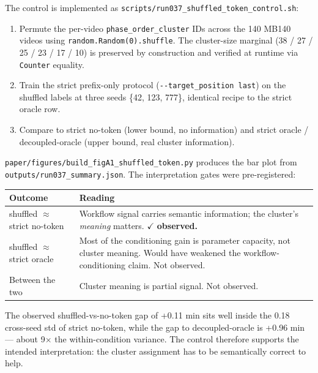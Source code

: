 The control is implemented as
\texttt{scripts/run037\_shuffled\_token\_control.sh}:

\begin{enumerate}
\def\labelenumi{\arabic{enumi}.}
\tightlist
\item
  Permute the per-video \texttt{phase\_order\_cluster} IDs across the
  140 MB140 videos using \texttt{random.Random(0).shuffle}. The
  cluster-size marginal (38 / 27 / 25 / 23 / 17 / 10) is preserved by
  construction and verified at runtime via \texttt{Counter} equality.
\item
  Train the strict prefix-only protocol
  (\texttt{-\/-target\_position\ last}) on the shuffled labels at three
  seeds \{42, 123, 777\}, identical recipe to the strict oracle row.
\item
  Compare to strict no-token (lower bound, no information) and strict
  oracle / decoupled-oracle (upper bound, real cluster information).
\end{enumerate}

\texttt{paper/figures/build\_figA1\_shuffled\_token.py} produces the bar
plot from \texttt{outputs/run037\_summary.json}. The interpretation
gates were pre-registered:

\begin{longtable}[]{@{}
  >{\raggedright\arraybackslash}p{}
  >{\raggedright\arraybackslash}p{}@{}}
\toprule\noalign{}
\begin{minipage}[b]{\linewidth}\raggedright
Outcome
\end{minipage} & \begin{minipage}[b]{\linewidth}\raggedright
Reading
\end{minipage} \\
\midrule\noalign{}
\endhead
\bottomrule\noalign{}
\endlastfoot
shuffled $\approx$ strict no-token & Workflow signal carries semantic
information; the cluster's \emph{meaning} matters. $\checkmark$
\textbf{observed.} \\
shuffled $\approx$ strict oracle & Most of the conditioning gain is parameter
capacity, not cluster meaning. Would have weakened the
workflow-conditioning claim. Not observed. \\
Between the two & Cluster meaning is partial signal. Not observed. \\
\end{longtable}

The observed shuffled-vs-no-token gap of +0.11 min sits well inside the
0.18 cross-seed std of strict no-token, while the gap to
decoupled-oracle is +0.96 min --- about 9$\times$ the within-condition
variance. The control therefore supports the intended interpretation:
the cluster assignment has to be semantically correct to help.

